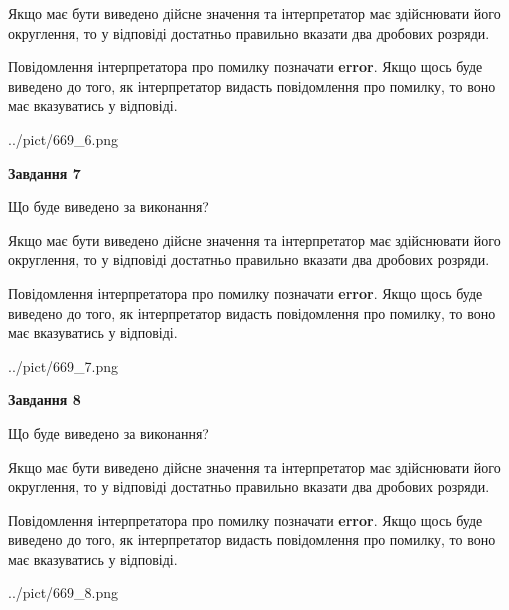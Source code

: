 \documentclass[12pt, ukrainian]{article}
\begin{document}
{\begin {Large}
Якщо має бути виведено дійсне значення та інтерпретатор має здійснювати його округлення, 
то у відповіді достатньо правильно вказати два дробових розряди.

Повідомлення інтерпретатора про помилку позначати \textbf{error}.
Якщо щось буде виведено до того, як інтерпретатор видасть повідомлення про помилку, 
то воно має вказуватись у відповіді. \par

\begin{center}
	{../pict/669_6.png}
\end{center}
\newpage

{\begin {center}\textbf{Завдання 7}\end {center}}\par
Що буде виведено за виконання? \par

Якщо має бути виведено дійсне значення та інтерпретатор має здійснювати його округлення, 
то у відповіді достатньо правильно вказати два дробових розряди.

Повідомлення інтерпретатора про помилку позначати \textbf{error}.
Якщо щось буде виведено до того, як інтерпретатор видасть повідомлення про помилку, 
то воно має вказуватись у відповіді. \par

\begin{center}
	{../pict/669_7.png}
\end{center}
\newpage

{\begin {center}\textbf{Завдання 8}\end {center}}\par
Що буде виведено за виконання? \par

Якщо має бути виведено дійсне значення та інтерпретатор має здійснювати його округлення, 
то у відповіді достатньо правильно вказати два дробових розряди.

Повідомлення інтерпретатора про помилку позначати \textbf{error}.
Якщо щось буде виведено до того, як інтерпретатор видасть повідомлення про помилку, 
то воно має вказуватись у відповіді. \par

\begin{center}
	{../pict/669_8.png}
\end{center}
\newpage


\end{Large}}
\end{document}
